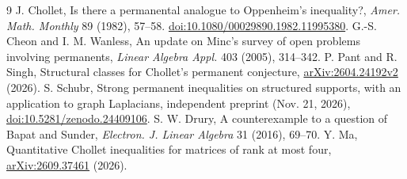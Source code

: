 \documentclass[11pt]{article}
\begin{document}
\begin{thebibliography}{9}
 J. Chollet, Is there a permanental analogue to Oppenheim's inequality?,
\emph{Amer. Math. Monthly} 89 (1982), 57--58.
\href{https://doi.org/10.1080/00029890.1982.11995380}{doi:10.1080/00029890.1982.11995380}.
 G.-S. Cheon and I. M. Wanless, An update on Minc's survey of open problems
involving permanents, \emph{Linear Algebra Appl.} 403 (2005), 314--342.
 P. Pant and R. Singh, Structural classes for Chollet's permanent conjecture,
\href{https://arxiv.org/abs/2604.24192}{arXiv:2604.24192v2} (2026).
 S. Schubr, Strong permanent inequalities on structured supports,
with an application to graph Laplacians, independent preprint (Nov. 21, 2026),
\href{https://doi.org/10.5281/zenodo.24409106}{doi:10.5281/zenodo.24409106}.
 S. W. Drury, A counterexample to a question of Bapat and Sunder,
\emph{Electron. J. Linear Algebra} 31 (2016), 69--70.
 Y. Ma, Quantitative Chollet inequalities for matrices of rank at most four,
\href{https://arxiv.org/abs/2609.37461}{arXiv:2609.37461} (2026).
\end{thebibliography}
\end{document}
